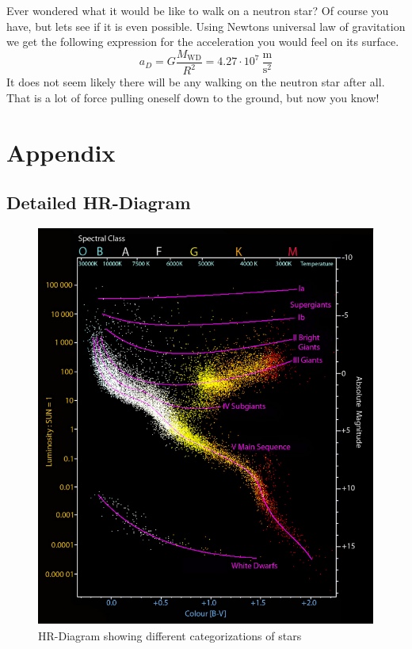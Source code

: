 \documentclass[reprint,english,notitlepage]{revtex4-2}
\begin{document}
Ever wondered what it would be like to walk on a neutron star? Of course you have, but lets see if it is even possible. Using Newtons universal law of gravitation we get the following expression for the acceleration you would feel on its surface. 
\begin{equation}\label{eq: Dwarf gravity}
  a_D = G \frac{M_\text{WD}}{R^{2}} = 4.27 ⋅ 10^{7} \ \frac{\text{m}}{\text{s}^{2}}
\end{equation}
It does not seem likely there will be any walking on the neutron star after all. That is a lot of force pulling oneself down to the ground, but now you know!
  
\newpage
\phantom
\newpage
\newpage
\onecolumngrid
\section{Appendix} \label{sec: appendix}
\subsection{Detailed HR-Diagram}
\begin{figure}[h!]
  \centering
  \includegraphics[scale = .75]{figures/Spectral_class}
  \caption{HR-Diagram showing different categorizations of stars%
  }
  \label{fig: Spectral class}
\end{figure}
\clearpage
\twocolumngrid

\newpage
\end{document}
